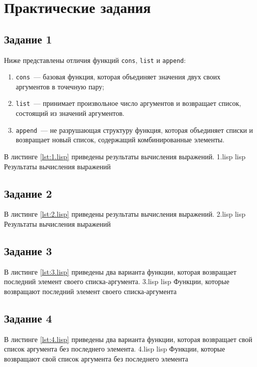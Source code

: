 \chapter{Практические задания}

\section{Задание 1}

Ниже представлены отличия функций \texttt{cons}, \texttt{list} и \texttt{append}:
\begin{enumerate}
	\item \texttt{cons}~--- базовая функция, которая объединяет значения двух своих аргументов в точечную пару;
	\item \texttt{list}~--- принимает произвольное число аргументов и возвращает список, состоящий из значений аргументов. 
	\item \texttt{append}~--- не разрушающая структуру функция, которая объединяет списки и возвращает новый список, содержащий комбинированные элементы.
\end{enumerate}

В листинге \ref{lst:1.lisp} приведены результаты вычисления выражений.
	{1.lisp}
	{lisp}
	{Результаты вычисления выражений}

\section{Задание 2}

В листинге \ref{lst:2.lisp} приведены результаты вычисления выражений.
	{2.lisp}
	{lisp}
	{Результаты вычисления выражений}

\section{Задание 3}

В листинге \ref{lst:3.lisp} приведены два варианта функции, которая возвращает последний элемент своего списка-аргумента.
	{3.lisp}
	{lisp}
	{Функции, которые возвращают последний элемент своего списка-аргумента}

\section{Задание 4}

В листинге \ref{lst:4.lisp} приведены два варианта функции, которая возвращает свой список аргумента без последнего элемента.
	{4.lisp}
	{lisp}
	{Функции, которые возвращают свой список аргумента без последнего элемента}

